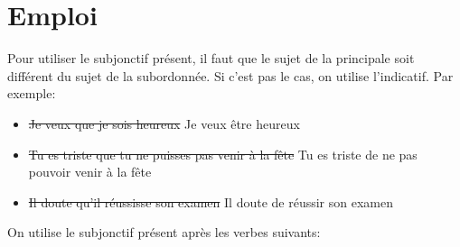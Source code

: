 \documentclass{report}
\begin{document}
\section{Emploi}
Pour utiliser le subjonctif présent, il faut que le sujet de la principale soit différent du sujet de la subordonnée. Si c'est pas le cas, on utilise l'indicatif.
Par exemple:
\begin{itemize}
    \item \st{Je veux que je sois heureux} \textrightarrow Je veux être heureux
    \item \st{Tu es triste que tu ne puisses pas venir à la fête} \textrightarrow Tu es triste de ne pas pouvoir venir à la fête
    \item \st{Il doute qu’il réussisse son examen} \textrightarrow Il doute de réussir son examen
\end{itemize}
On utilise le subjonctif présent après les verbes suivants:
\end{document}
